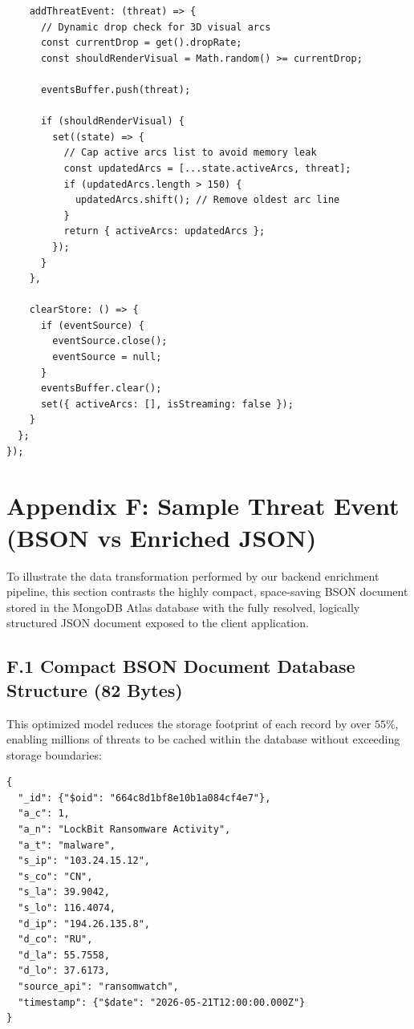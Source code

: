\begin{verbatim}
    addThreatEvent: (threat) => {
      // Dynamic drop check for 3D visual arcs
      const currentDrop = get().dropRate;
      const shouldRenderVisual = Math.random() >= currentDrop;

      eventsBuffer.push(threat);

      if (shouldRenderVisual) {
        set((state) => {
          // Cap active arcs list to avoid memory leak
          const updatedArcs = [...state.activeArcs, threat];
          if (updatedArcs.length > 150) {
            updatedArcs.shift(); // Remove oldest arc line
          }
          return { activeArcs: updatedArcs };
        });
      }
    },

    clearStore: () => {
      if (eventSource) {
        eventSource.close();
        eventSource = null;
      }
      eventsBuffer.clear();
      set({ activeArcs: [], isStreaming: false });
    }
  };
});
\end{verbatim}

\section*{Appendix F: Sample Threat Event (BSON vs Enriched JSON)}
To illustrate the data transformation performed by our backend enrichment pipeline, this section contrasts the highly compact, space-saving BSON document stored in the MongoDB Atlas database with the fully resolved, logically structured JSON document exposed to the client application.

\subsection*{F.1 Compact BSON Document Database Structure (82 Bytes)}
This optimized model reduces the storage footprint of each record by over $55\%$, enabling millions of threats to be cached within the database without exceeding storage boundaries:
\begin{verbatim}
{
  "_id": {"$oid": "664c8d1bf8e10b1a084cf4e7"},
  "a_c": 1,
  "a_n": "LockBit Ransomware Activity",
  "a_t": "malware",
  "s_ip": "103.24.15.12",
  "s_co": "CN",
  "s_la": 39.9042,
  "s_lo": 116.4074,
  "d_ip": "194.26.135.8",
  "d_co": "RU",
  "d_la": 55.7558,
  "d_lo": 37.6173,
  "source_api": "ransomwatch",
  "timestamp": {"$date": "2026-05-21T12:00:00.000Z"}
}
\end{verbatim}

